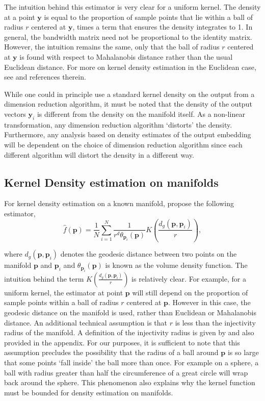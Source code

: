 \documentclass[11pt,a4paper,]{article}
\begin{document}
The intuition behind this estimator is very clear for a uniform kernel. The density at a point \(\pmb{y}\) is equal to the proportion of sample points that lie within a ball of radius \(r\) centered at \(\pmb{y}\), times a term that ensures the density integrates to 1. In general, the bandwidth matrix need not be proportional to the identity matrix. However, the intuition remains the same, only that the ball of radius \(r\) centered at \(\pmb{y}\) is found with respect to Mahalanobis distance rather than the usual Euclidean distance. For more on kernel density estimation in the Euclidean case, see \textcite{Scott2015-vl} and references therein.

While one could in principle use a standard kernel density on the output from a dimension reduction algorithm, it must be noted that the density of the output vectors \(\pmb{y}_i\) is different from the density on the manifold itself. As a non-linear transformation, any dimension reduction algorithm `distorts' the density. Furthermore, any analysis based on density estimates of the output embedding will be dependent on the choice of dimension reduction algorithm since each different algorithm will distort the density in a different way.

\hypertarget{Pellet}{%
\subsection{Kernel Density estimation on manifolds}\label{Pellet}}

For kernel density estimation on a known manifold, \textcite{Pelletier2005-vu} propose the following estimator,
\begin{equation}
\label{eq:denriem}
\hat{f}(\pmb{p}) = \frac{1}{N} \sum_{i=1}^{N} \frac{1}{r^d \theta_{\pmb{p}_i}(\pmb{p})} K\left(\frac{d_g(\pmb{p}, \pmb{p}_i)}{r}\right),
\end{equation}

where \(d_g(\pmb{p}, \pmb{p}_i)\) denotes the geodesic distance between two points on the manifold \(\pmb{p}\) and \(\pmb{p}_i\) and \(\theta_{\pmb{p}_i}(\pmb{p})\) is known as the volume density function. The intuition behind the term \(K\left(\frac{d_g(\pmb{p}, \pmb{p}_i)}{r}\right)\) is relatively clear. For example, for a uniform kernel, the estimator at point \(\pmb{p}\) will still depend on the proportion of sample points within a ball of radius \(r\) centered at \(\pmb{p}\). However in this case, the geodesic distance on the manifold is used, rather than Euclidean or Mahalanobis distance. An additional technical assumption is that \(r\) is less than the injectivity radius of the manifold. A definition of the injectivity radius is given by \textcite{Chavel2006-mp} and also provided in the appendix. For our purposes, it is sufficient to note that this assumption precludes the possibility that the radius of a ball around \(\pmb{p}\) is so large that some points `fall inside' the ball more than once. For example on a sphere, a ball with radius greater than half the circumference of a great circle will wrap back around the sphere. This phenomenon also explains why the kernel function must be bounded for density estimation on manifolds.
\end{document}
